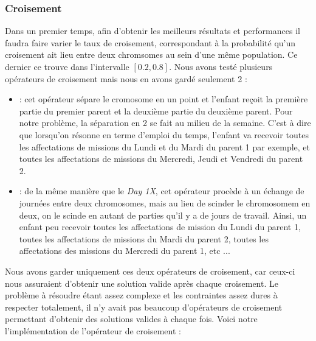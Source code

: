 \documentclass{article}
\begin{document}
        \subsubsection{Croisement}
        Dans un premier temps, afin d'obtenir les meilleurs résultats et performances il faudra faire varier le taux de croisement, correspondant à la probabilité qu'un croisement ait lieu entre deux chromsomes au sein d'une même population. Ce dernier ce trouve dans l'intervalle $[0.2, 0.8]$.
        \newline
        \newline
        Nous avons testé plusieurs opérateurs de croisement mais nous en avons gardé seulement 2 :
        \begin{itemize}
        \item {} : cet opérateur sépare le cromosome en un point et l'enfant reçoit la première partie du premier parent et la deuxième partie du deuxième parent. Pour notre problème, la séparation en 2 se fait au milieu de la semaine. C'est à dire que lorsqu'on résonne en terme d'emploi du temps, l'enfant va recevoir toutes les affectations de missions du Lundi et du Mardi du parent 1 par exemple, et toutes les affectations de missions du Mercredi, Jeudi et Vendredi du parent 2. 
        \item {} : de la même manière que le \emph{Day 1X}, cet opérateur procède à un échange de journées entre deux chromosomes, mais au lieu de scinder le chromosomem en deux, on le scinde en autant de parties qu'il y a de jours de travail. Ainsi, un enfant peu recevoir toutes les affectations de mission du Lundi du parent 1, toutes les affectations de missions du Mardi du parent 2, toutes les affectations des missions du Mercredi du parent 1, etc ...
        \end{itemize}
        Nous avons garder uniquement ces deux opérateurs de croisement, car ceux-ci nous assuraient d'obtenir une solution valide après chaque croisement. Le problème à résoudre étant assez complexe et les contraintes assez dures à respecter totalement, il n'y avait pas beaucoup d'opérateurs de croisement permettant d'obtenir des solutions valides à chaque fois. Voici notre l'implémentation de l'opérateur de croisement  :
\end{document}
